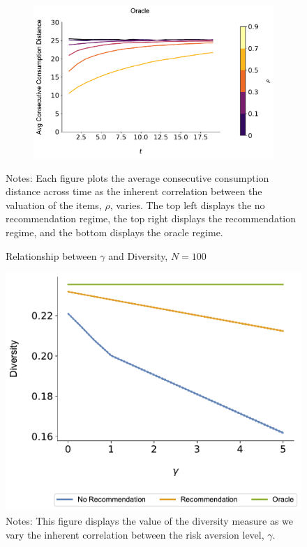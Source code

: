 \documentclass[format=acmsmall, review=true]{acmart}
\begin{document}
\begin{figure}[H]
\begin{subfigure}{.45\textwidth}
\end{subfigure}\\
\begin{subfigure}{.45\textwidth}
\includegraphics[width=\linewidth]{figures/rho_consumption_dist_N_100T_20_omni.pdf}\\
\end{subfigure}
\caption*{\scriptsize Notes: Each figure plots the average consecutive consumption distance across time as the inherent correlation between the valuation of the items, $\rho$, varies. The top left displays the no recommendation regime, the top right displays the recommendation regime, and the bottom displays the oracle regime.}
\label{fig:local_consumption_across_rho}
\end{figure}

\begin{figure}[ht]
\caption{Relationship between $\gamma$ and Diversity, $N = 100$}
\includegraphics[width=.45\linewidth]{figures/gamma_diversity_N_100_T_20}
\caption*{\scriptsize Notes: This figure displays the value of the diversity measure as we vary the inherent correlation between the risk aversion level, $\gamma$.}\label{fig:cor_homo}
\end{figure}
\end{document}
